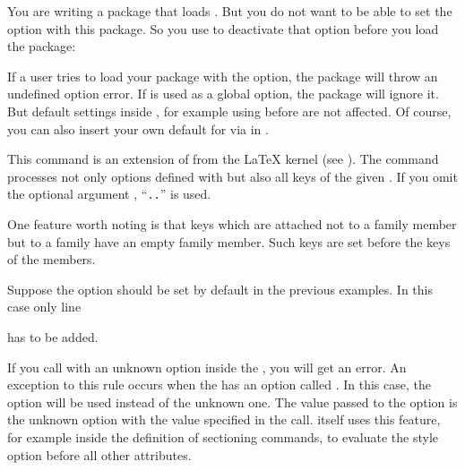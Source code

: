 \begin{Example}
  You are writing a  package that loads
  . But you do not want to be able to set the
   option with this package. So you use
   to deactivate that option before you load
  the package:
\begin{lstcode}
  \RequirePackage{scrbase}
\end{lstcode}
  If a user tries to load your package with the  option, the
   package will throw an undefined option error. If
   is used as a global option, the 
  package will ignore it. But default settings inside ,
  for example using  before
   are not affected. Of course,
  you can also insert your own default for  via
   in .
\end{Example}
\EndIndexGroup


\begin{Declaration}
\end{Declaration}
This command is an extension of  from the \LaTeX{}
kernel (see \cite{latex:clsguide}). The command processes not only options
defined with  but also all keys of the given
. If you omit the optional argument ,
``\texttt{.}\texttt{.}'' is used.

One feature worth noting is that keys which are attached not to a family
member but to a family have an empty family member. Such keys are set before
the keys of the members.
\begin{Example}
  Suppose the  option should be set by default in the
  previous examples. In this case only line
\begin{lstcode}
\end{lstcode}
  has to be added.
\end{Example}

If you call 
with an unknown option inside the , you will get an error.
An exception to this rule occurs when the  has an option called
. In this case, the  option will be used instead
of the unknown one. The value passed to the  option is the
unknown option with the value specified in the call. \KOMAScript{} itself uses
this feature, for example inside the definition of sectioning commands,
to evaluate the style option before all other attributes.


